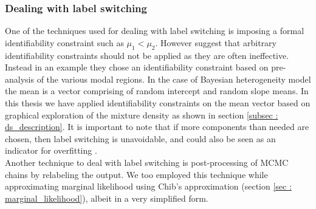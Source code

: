 \subsubsection{Dealing with label switching}
One of the techniques used for dealing with label switching is imposing a formal identifiability constraint such as $\mu_1 < \mu_2$. However \citet{fruhwirth-schnatter_bayesian_2004} suggest that arbitrary identifiability constraints should not be applied as they are often ineffective. Instead in an example they chose an identifiability constraint based on pre-analysis of the various modal regions. In the case of Bayesian heterogeneity model the mean is a vector comprising of random intercept and random slope means. In this thesis we have applied identifiability constraints on the mean vector based on graphical exploration of the mixture density as shown in section \ref{subsec : ds_description}. It is important to note that if more components than needed are chosen, then label switching is unavoidable, and could also be seen as an indicator for overfitting \citep[pg. 104]{fruhwirth-schnatter_finite_2013}.\\

Another technique to deal with label switching is post-processing of MCMC chains by relabeling the output\citep{richardson_bayesian_1997,stephens_dealing_2000}. We too employed this technique while approximating marginal likelihood using Chib's approximation (section \ref{sec : marginal_likelihood}), albeit in a very simplified form.